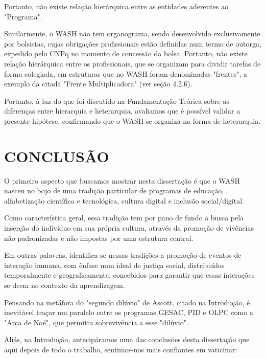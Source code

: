 Portanto, não existe relação hierárquica entre as entidades aderentes ao "Programa".

Similarmente, o WASH não tem organograma, sendo desenvolvido exclusivamente por bolsistas, cujas obrigações profissionais estão definidas num termo de outorga, expedido pelo CNPq no momento de concessão da bolsa. Portanto, não existe relação hierárquica entre os profissionais, que se organizam para dividir tarefas de forma colegiada, em estruturas que no WASH foram denominadas "frentes", a exemplo da citada "Frente Multiplicadora" (ver seção 4.2.6).

Portanto, à luz do que foi discutido na Fundamentação Teórica sobre as diferenças entre hierarquia e heterarquia, avaliamos que é possível validar a presente hipótese, confirmando que o WASH se organiza na forma de heterarquia.

\chapter[CONCLUSÃO]{CONCLUSÃO}\label{CONCLUSÃO}
O primeiro aspecto que buscamos mostrar nesta dissertação é que o WASH nasceu no bojo de uma tradição particular de programas de educação, alfabetização científica e tecnológica, cultura digital e inclusão social/digital.

Como característica geral, essa tradição tem por pano de fundo a busca pela inserção do indivíduo em sua própria cultura, através da promoção de vivências não padronizadas e não impostas por uma estrutura central.

Em outras palavras, identifica-se nessas tradições a promoção de eventos de interação humana, com ênfase num ideal de justiça social, distribuídos temporalmente e geograficamente, concebidos para garantir que essas interações se deem no contexto da aprendizagem.

Pensando na metáfora do "segundo dilúvio" de Ascott, citado na Introdução, é inevitável traçar um paralelo entre os programas GESAC, PID e OLPC como a "Arca de Noé", que permitiu sobrevivência a esse "dilúvio".

Aliás, na Introdução, antecipáramos uma das conclusões desta dissertação que aqui depois de todo o trabalho,  sentimos-nos mais confiantes em vaticinar:


\noindent\begin{center}\mbox{\centering{}}\end{center}


